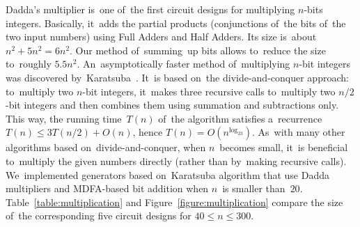 \documentclass[sigconf, review, anonymous]{acmart}
\begin{document}
Dadda's multiplier is~one of~the first circuit designs for multiplying $n$-bits integers. Basically, it~adds the partial products (conjunctions of~the bits of~the
two input numbers) using Full Adders and Half Adders. Its size is~about $n^2+5n^2=6n^2$. Our method of~summing~up bits allows to~reduce the size 
to~roughly $5.5n^2$. An~asymptotically faster method of~multiplying 
$n$-bit integers was discovered by~Karatsuba~\cite{karatsuba}. It~is based 
on~the divide-and-conquer approach: to~multiply two $n$-bit integers,
it~makes three recursive calls to~multiply two $n/2$-bit integers and
then combines them using summation and subtractions only. This way, the running 
time~$T(n)$ of~the algorithm satisfies a~recurrence $T(n) \le 3T(n/2)+O(n)$,
hence $T(n)=O(n^{\log_23})$. As~with many other algorithms based on~divide-and-conquer, when $n$~becomes small, it~is beneficial to~multiply
the given numbers directly (rather than by~making recursive calls). 
We~implemented generators based on~Karatsuba algorithm that 
use Dadda multipliers and MDFA-based bit addition when $n$~is smaller than~$20$.
Table~\ref{table:multiplication} and Figure~\ref{figure:multiplication}
compare the size of~the corresponding five circuit designs for $40 \le n \le 300$.
\end{document}
